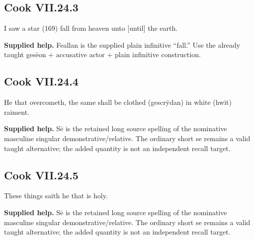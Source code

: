 \par\begin{minipage}{\linewidth}\raggedright
\subsection*{Cook VII.24.3}

I saw a star (169) fall from heaven unto [until] the earth.

\end{minipage}\par\addvspace{4pt}

\textbf{Supplied help.} Feallan is the supplied plain infinitive “fall.” Use the already taught gesēon + accusative actor + plain infinitive construction.

\par\begin{minipage}{\linewidth}\raggedright
\subsection*{Cook VII.24.4}

He that overcometh, the same shall be clothed (gescrȳdan) in white (hwīt) raiment.

\textbf{Supplied help.} Sē is the retained long source spelling of the nominative masculine singular demonstrative/\allowbreak{}relative. The ordinary short se remains a valid taught alternative; the added quantity is not an independent recall target.

\end{minipage}\par\addvspace{4pt}

\par\begin{minipage}{\linewidth}\raggedright
\subsection*{Cook VII.24.5}

These things saith he that is holy.

\textbf{Supplied help.} Sē is the retained long source spelling of the nominative masculine singular demonstrative/\allowbreak{}relative. The ordinary short se remains a valid taught alternative; the added quantity is not an independent recall target.

\end{minipage}\par\addvspace{4pt}

